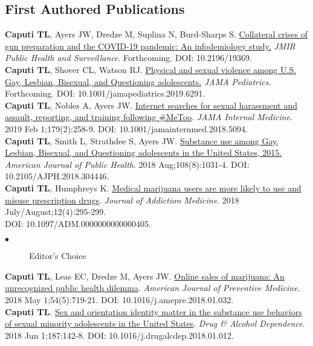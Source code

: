 \documentclass[11pt, letterpaper]{article}
\newcommand{\years}[1]{\marginnote{\normalsize #1}}
\begin{document}
\subsection*{First Authored Publications}
\noindent
\years{2020}\textbf{Caputi TL}, Ayers JW, Dredze M, Suplina N, Burd-Sharps S. \href{https://dx.doi.org/10.2196/19369}{Collateral crises of gun preparation and the COVID-19 pandemic: An infodemiology study.} \textit{JMIR Public Health and Surveillance}. Forthcoming. DOI: 10.2196/19369.\\[.2cm]
\years{2020}\textbf{Caputi TL}, Shover CL, Watson RJ. \href{https://dx.doi.org/10.1001/jamapediatrics.2019.6291}{Physical and sexual violence among U.S. Gay, Lesbian, Bisexual, and Questioning adolescents.} \textit{JAMA Pediatrics}. Forthcoming. DOI: 10.1001/jamapediatrics.2019.6291.\\[.2cm]
\years{2018}\textbf{Caputi TL}, Nobles A, Ayers JW. \href{https://dx.doi.org/10.1001/jamainternmed.2018.5094}{Internet searches for sexual harassment and assault, reporting, and training following \#MeToo}. \textit{JAMA Internal Medicine.} 2019 Feb 1;179(2):258-9. DOI: 10.1001/jamainternmed.2018.5094.\\[.2cm]
\years{2018}\textbf{Caputi TL}, Smith L, Strathdee S, Ayers JW. \href{http://dx.doi.org/10.2105/AJPH.2018.304446}{Substance use among Gay, Lesbian, Bisexual, and Questioning adolescents in the United States, 2015.} \textit{American Journal of Public Health}. 2018 Aug;108(8):1031-4. DOI: 10.2105/AJPH.2018.304446.\\[.2cm]
\years{2018}\textbf{Caputi TL}, Humphreys K. \href{http://dx.doi.org/10.1097/ADM.0000000000000405}{Medical marijuana users are more likely to use and misuse prescription drugs}.  \textit{Journal of Addiction Medicine}. 2018 July/August;12(4):295-299. \\
DOI: 10.1097/ADM.0000000000000405.
    \begin{description}
    \item[$\bullet$] Editor's Choice
    \end{description}
\years{2018}\textbf{Caputi TL}, Leas EC, Dredze M, Ayers JW.
\href{http://dx.doi.org/10.1016/j.amepre.2018.01.032}{Online sales of marijuana: An unrecognized public health dilemma}. \textit{American Journal of Preventive Medicine}. 2018 May 1;54(5):719-21. DOI: 10.1016/j.amepre.2018.01.032.\\[.2cm]
\years{2018}\textbf{Caputi TL}. \href{https://doi.org/10.1016/j.drugalcdep.2018.01.012
}{Sex and orientation identity matter in the substance use behaviors of sexual minority adolescents in the United States}. \emph{Drug \& Alcohol Dependence}. 2018 Jun 1;187:142-8. DOI: 10.1016/j.drugalcdep.2018.01.012.
\end{document}
